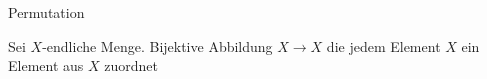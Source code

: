 \documentclass[class=article, crop=false]{standalone}
\begin{document}
\begin{zettel}{Permutation}
\begin{flashcard}
    Sei $X$-endliche Menge. Bijektive Abbildung $X \to  X$ die jedem Element $X$ ein Element aus $X$ zuordnet

\end{flashcard}
\end{zettel}
\end{document}
